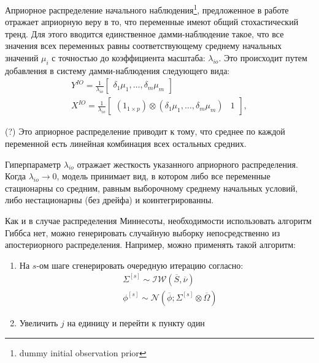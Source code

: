 \documentclass[11pt]{article} %
\newcommand{\cN}{\mathcal{N}}
\newcommand{\cIW}{\mathcal{IW}}
\newcommand{\post}{\overline}
\begin{document}
Априорное распределение начального наблюдения\footnote{dummy initial observation prior }, предложенное в работе \cite{sims_1993_nine} отражает априорную веру в то, что переменные имеют общий стохастический тренд. Для этого вводится единственное дамми-наблюдение такое, что все значения всех переменных равны соответствующему среднему начальных значений $\mu_i$ с точностью до коэффициента масштаба: $\lambda_{io}$. Это происходит  путем добавления в систему дамми-наблюдения следующего вида:
\begin{gather}
Y^{IO}=\frac{1}{\lambda_{io}}\begin{bmatrix}
\delta_1\mu_1,\ldots,\delta_m\mu_m
\end{bmatrix}\\
X^{IO}=\frac{1}{\lambda_{io}}\begin{bmatrix}
(1_{1\times p})\otimes (\delta_1\mu_1,\ldots,\delta_m\mu_m) &1
\end{bmatrix},
\end{gather}

(?) Это априорное распределение приводит к тому, что среднее по каждой переменной есть линейная комбинация всех остальных средних.




Гиперпараметр $\lambda_{io}$ отражает жесткость указанного априорного распределения. Когда $\lambda_{io}\to 0 $,  модель принимает вид, в котором либо все переменные стационарны со средним, равным выборочному среднему начальных условий, либо нестационарны (без дрейфа) и коинтегрированны. 


Как и в случае распределения Миннесоты, необходимости использовать алгоритм Гиббса нет, можно генерировать случайную выборку непосредственно из апостериорного распределения. Например, можно применять такой алгоритм:


\begin{enumerate}
\item На $s$-ом шаге сгенерировать очередную итерацию согласно:
\begin{align*}
&\Sigma^{[s]} \sim \cIW(\post S, \post \nu) \\
&\phi^{[s]}\sim \cN(\post \phi; \Sigma^{[s]} \otimes \post \Omega)
\end{align*}
\item Увеличить $j$ на единицу и перейти к пункту один
\end{enumerate}
\end{document}
